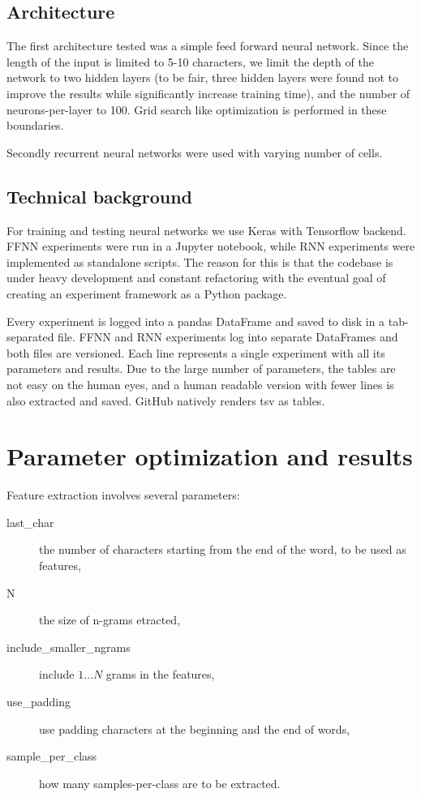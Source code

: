 \documentclass{article}
\begin{document}
\subsection{Architecture}

The first architecture tested was a simple feed forward neural network.
Since the length of the input is limited to 5-10 characters, we limit the depth of the network to two hidden layers (to be fair, three hidden layers were found not to improve the results while significantly increase training time), and the number of neurons-per-layer to 100.
Grid search like optimization is performed in these boundaries.

Secondly recurrent neural networks were used with varying number of cells.

\subsection{Technical background}

For training and testing neural networks we use Keras with Tensorflow backend.
FFNN experiments were run in a Jupyter notebook, while RNN experiments were implemented as standalone scripts.
The reason for this is that the codebase is under heavy development and constant refactoring with the eventual goal of creating an experiment framework as a Python package.

Every experiment is logged into a pandas DataFrame and saved to disk in a tab-separated file.
FFNN and RNN experiments log into separate DataFrames and both files are versioned.
Each line represents a single experiment with all its parameters and results.
Due to the large number of parameters, the tables are not easy on the human eyes, and a human readable version with fewer lines is also extracted and saved.
GitHub natively renders tsv as tables.

\section{Parameter optimization and results}

Feature extraction involves several parameters:

\begin{description}
    \item[last\_char] the number of characters starting from the end of the word, to be used as features,
    \item[N] the size of n-grams etracted,
    \item[include\_smaller\_ngrams] include $1\dots N$ grams in the features,
    \item[use\_padding] use padding characters at the beginning and the end of words,
    \item[sample\_per\_class] how many samples-per-class are to be extracted.
\end{description}
\end{document}
